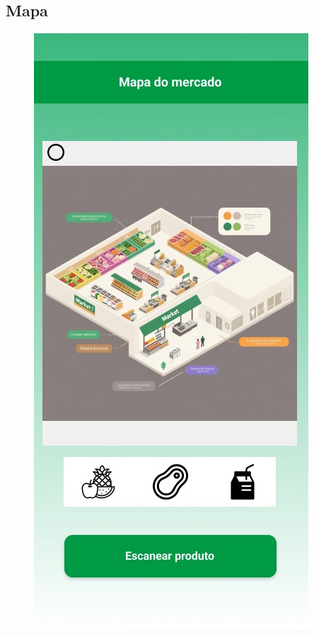 \documentclass[12pt,oneside,a4paper,article]{abntex2}
\begin{document}
    \subsection{Mapa}
    \begin{figure}[H]
        \centering
        \includegraphics[width=0.5\linewidth]{imagens-template//telas/mapa.jpg}
        \label{fig:placeholder}
    \end{figure}
\end{document}
